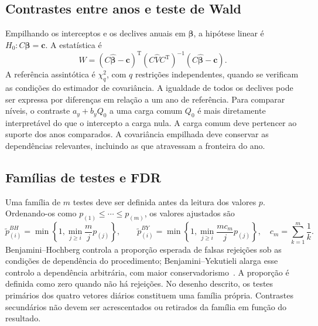 \subsection{Contrastes entre anos e teste de Wald}
\label{sec:mat-wald}
Empilhando os interceptos e os declives anuais em $\widehat{\boldsymbol\beta}$, a hipótese linear é $H_0:C\boldsymbol\beta=\boldsymbol c$. A estatística é
\begin{equation}
W=(C\widehat{\boldsymbol\beta}-\boldsymbol c)^{\mathrm T}
(C\widehat V C^{\mathrm T})^{-1}
(C\widehat{\boldsymbol\beta}-\boldsymbol c).
\label{eq:mat-wald}
\end{equation}
A referência assintótica é $\chi^2_q$, com $q$ restrições independentes, quando se verificam as condições do estimador de covariância. A igualdade de todos os declives pode ser expressa por diferenças em relação a um ano de referência. Para comparar níveis, o contraste $a_y+b_yQ_0$ a uma carga comum $Q_0$ é mais diretamente interpretável do que o intercepto a carga nula. A carga comum deve pertencer ao suporte dos anos comparados. A covariância empilhada deve conservar as dependências relevantes, incluindo as que atravessam a fronteira do ano.

\subsection{Famílias de testes e FDR}
\label{sec:mat-fdr}
Uma família de $m$ testes deve ser definida antes da leitura dos valores $p$. Ordenando-os como $p_{(1)}\leq\cdots\leq p_{(m)}$, os valores ajustados são
\begin{equation}
\widetilde p_{(i)}^{BH}=\min\left\{1,\min_{j\geq i}\frac{m}{j}p_{(j)}\right\},
\qquad
\widetilde p_{(i)}^{BY}=\min\left\{1,\min_{j\geq i}\frac{mc_m}{j}p_{(j)}\right\},
\quad c_m=\sum_{k=1}^m\frac1k.
\label{eq:mat-fdr}
\end{equation}
Benjamini--Hochberg controla a proporção esperada de falsas rejeições sob as condições de dependência do procedimento; Benjamini--Yekutieli alarga esse controlo a dependência arbitrária, com maior conservadorismo~\parencite{BenjaminiHochberg1995,BenjaminiYekutieli2001}. A proporção é definida como zero quando não há rejeições. No desenho descrito, os testes primários dos quatro vetores diários constituem uma família própria. Contrastes secundários não devem ser acrescentados ou retirados da família em função do resultado.

